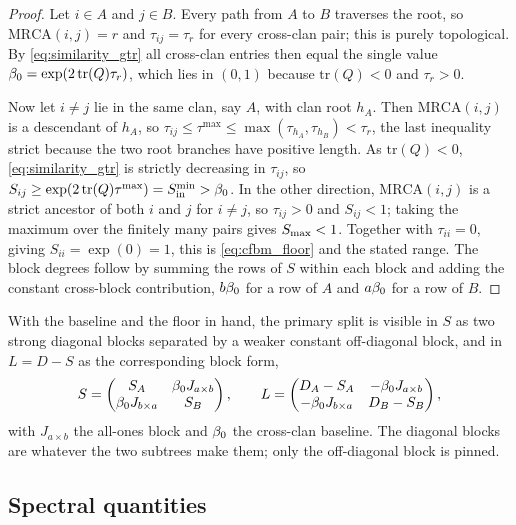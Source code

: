 \begin{proof}
Let $i \in A$ and $j \in B$. Every path from $A$ to $B$ traverses the root, so
$\mathrm{MRCA}(i,j) = r$ and $\tau_{ij} = \tau_r$ for every cross-clan pair; this is
purely topological. By \eqref{eq:similarity_gtr} all cross-clan entries then equal
the single value $\beta_0 = \exp(2\,\mathrm{tr}(Q)\tau_r)$, which lies in $(0,1)$
because $\mathrm{tr}(Q)<0$ and $\tau_r>0$.

Now let $i \ne j$ lie in the same clan, say $A$, with clan root $h_A$. Then
$\mathrm{MRCA}(i,j)$ is a descendant of $h_A$, so
$\tau_{ij} \le \tau^{\max} \le \max(\tau_{h_A},\tau_{h_B}) < \tau_r$, the last
inequality strict because the two root branches have positive length. As
$\mathrm{tr}(Q)<0$, \eqref{eq:similarity_gtr} is strictly decreasing in $\tau_{ij}$,
so $S_{ij} \ge \exp(2\,\mathrm{tr}(Q)\tau^{\max}) = S_{\mathrm{in}}^{\min} > \beta_0$. In the
other direction, $\mathrm{MRCA}(i,j)$ is a strict ancestor of both $i$ and $j$ for
$i \ne j$, so $\tau_{ij}>0$ and $S_{ij}<1$; taking the maximum over the finitely
many pairs gives $S_{\max}<1$. Together with $\tau_{ii}=0$, giving
$S_{ii}=\exp(0)=1$, this is \eqref{eq:cfbm_floor} and the stated range. The block
degrees follow by summing the rows of $S$ within each block and adding the constant
cross-block contribution, $b\beta_0$ for a row of $A$ and $a\beta_0$ for a row of $B$.
\end{proof}


With the baseline and the floor in hand, the primary split is visible in $S$ as two
strong diagonal blocks separated by a weaker constant off-diagonal block, and in
$L = D - S$ as the corresponding block form,
\begin{equation}\label{eq:block_forms}
   S=\begin{pmatrix} S_A & \beta_0 J_{a\times b}\\ \beta_0 J_{b\times a} & S_B\end{pmatrix},
   \qquad
   L=\begin{pmatrix} D_A-S_A & -\beta_0 J_{a\times b}\\ -\beta_0 J_{b\times a} & D_B-S_B\end{pmatrix},
\end{equation}
with $J_{a\times b}$ the all-ones block and $\beta_0$ the cross-clan baseline. The
diagonal blocks are whatever the two subtrees make them; only the off-diagonal block
is pinned.

\subsection{Spectral quantities}\label{sec:model-spectral}

